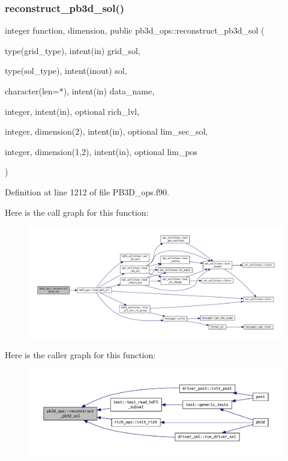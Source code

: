 \subsubsection{\texorpdfstring{reconstruct\+\_\+pb3d\+\_\+sol()}{reconstruct\_pb3d\_sol()}}
{\footnotesize\ttfamily integer function, dimension, public pb3d\+\_\+ops\+::reconstruct\+\_\+pb3d\+\_\+sol (\begin{DoxyParamCaption}\item[{type(grid\+\_\+type), intent(in)}]{grid\+\_\+sol,  }\item[{type(sol\+\_\+type), intent(inout)}]{sol,  }\item[{character(len=$\ast$), intent(in)}]{data\+\_\+name,  }\item[{integer, intent(in), optional}]{rich\+\_\+lvl,  }\item[{integer, dimension(2), intent(in), optional}]{lim\+\_\+sec\+\_\+sol,  }\item[{integer, dimension(1,2), intent(in), optional}]{lim\+\_\+pos }\end{DoxyParamCaption})}



Definition at line 1212 of file P\+B3\+D\+\_\+ops.\+f90.

Here is the call graph for this function\+:
\nopagebreak
\begin{figure}[H]
\begin{center}
\leavevmode
\includegraphics[width=350pt]{namespacepb3d__ops_a418960ddc3c8c0ec6ac0af970feedbe2_cgraph}
\end{center}
\end{figure}
Here is the caller graph for this function\+:
\nopagebreak
\begin{figure}[H]
\begin{center}
\leavevmode
\includegraphics[width=350pt]{namespacepb3d__ops_a418960ddc3c8c0ec6ac0af970feedbe2_icgraph}
\end{center}
\end{figure}
\mbox{\label{namespacepb3d__ops_ababe805fcaaca1486c74ad7a8aecfb7e}} 
